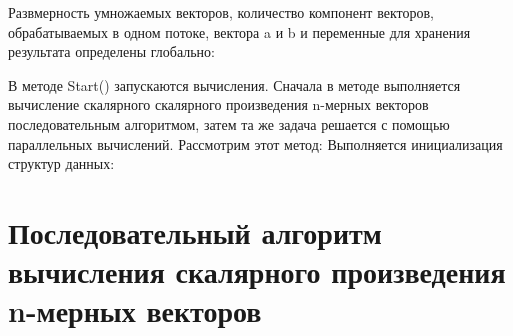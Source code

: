 Развмерность умножаемых векторов, количество компонент векторов, обрабатываемых в одном потоке, вектора a и b и переменные для хранения результата определены глобально:
\begin{figure}[h!]
\end{figure}

В методе Start() запускаются вычисления. Сначала в методе
выполняется вычисление скалярного скалярного произведения n-мерных векторов последовательным алгоритмом, затем та же задача решается с помощью
параллельных вычислений. Рассмотрим этот метод:
Выполняется инициализация структур данных:
\begin{figure}[h!]
\end{figure}

\section{Последовательный алгоритм вычисления скалярного произведения n-мерных векторов }

 
 \begin{figure}[h!]
 \end{figure}
 

